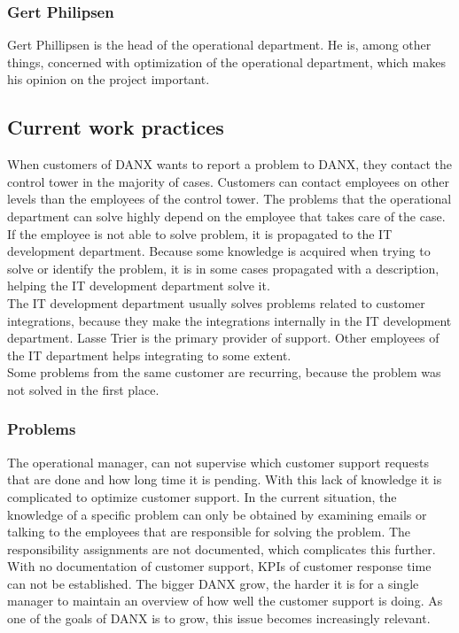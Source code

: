 \subsubsection{Gert Philipsen}
Gert Phillipsen is the head of the operational department. He is, among other things, concerned with optimization of the operational department\cite{gert015}, which makes his opinion on the project important.

\subsection{Current work practices}
When customers of DANX wants to report a problem to DANX, they contact the control tower in the majority of cases.\cite{gert004} Customers can contact employees on other levels than the employees of the control tower.\cite{gert007} The problems that the operational department can solve highly depend on the employee that takes care of the case.\cite{lasse002}\\
If the employee is not able to solve problem, it is propagated to the IT development department. Because some knowledge is acquired when trying to solve or identify the problem, it is in some cases propagated with a description, helping the IT development department solve it.\cite{gert006}\cite{lasse005}\\
The IT development department usually solves problems related to customer integrations, because they make the integrations internally in the IT development department. Lasse Trier is the primary provider of support.\cite{lahib004} Other employees of the IT department helps integrating to some extent.\cite{lahib002}\cite{lahib003}\\
Some problems from the same customer are recurring, because the problem was not solved in the first place.\cite{gert009}

\subsubsection{Problems}
The operational manager, can not supervise which customer support requests that are done and how long time it is pending. With this lack of knowledge it is complicated to optimize customer support. In the current situation, the knowledge of a specific problem can only be obtained by examining emails or talking to the employees that are responsible for solving the problem. The responsibility assignments are not documented, which complicates this further.\cite{gert012}\\
With no documentation of customer support, KPIs of customer response time can not be established.\cite{gert011} The bigger DANX grow, the harder it is for a single manager to maintain an overview of how well the customer support is doing. As one of the goals of DANX is to grow, this issue becomes increasingly relevant.

